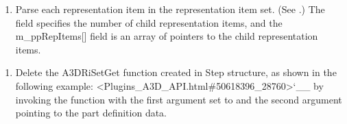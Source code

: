 \documentclass[letterpaper,12pt,english,openany,oneside]{sphinxmanual}
\begin{document}
\begin{sphinxVerbatim}[commandchars=\\\{\}]
 
   
\end{sphinxVerbatim}
\begin{enumerate}
%
\item {} 
Parse each representation item in the representation item set. (See .) The  field specifies the number of child representation items, and the m\_ppRepItems{[}{]} field is an array of pointers to the child representation items.

\end{enumerate}

\begin{sphinxVerbatim}[commandchars=\\\{\}]
     
  \PYG{p}{[}\PYG{p}{]}  
\end{sphinxVerbatim}
\begin{enumerate}
%
\item {} 
Delete the A3DRiSetGet function created in Step  structure, as shown in the following example: <Plugins\_A3D\_API.html\#50618396\_28760>`\_\_ by invoking the  function with the first argument set to  and the second argument pointing to the part definition data.

\end{enumerate}

\begin{sphinxVerbatim}[commandchars=\\\{\}]
 
\end{sphinxVerbatim}
\end{document}
